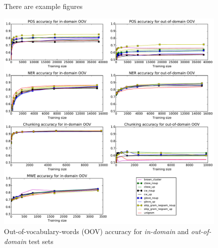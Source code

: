 \begin{figure}[htb]
 \caption{There are example figures}
\end{figure}
\fi



\begin{figure}
\centering
\caption{Out-of-vocabulary-words (OOV) accuracy for \textit{in-domain} and \textit{out-of-domain} test sets}
\label{OOV} 
    	\includegraphics[scale=0.5]{plots/OOV-plots}
\end{figure}







